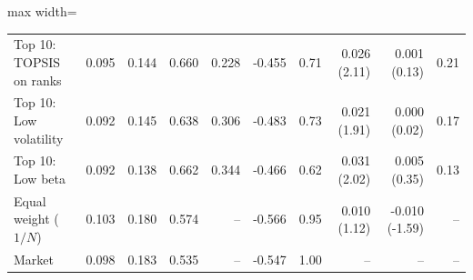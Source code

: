 \begin{table}[!htbp]
\begin{adjustbox}{max width=\textwidth}
\begin{tabular}{lrrrrrrrrr}
Top 10: TOPSIS on ranks & 0.095 & 0.144 & 0.660 & 0.228 & -0.455 & 0.71 & 0.026 (2.11) & 0.001 (0.13) & 0.21 \\
Top 10: Low volatility & 0.092 & 0.145 & 0.638 & 0.306 & -0.483 & 0.73 & 0.021 (1.91) & 0.000 (0.02) & 0.17 \\
Top 10: Low beta & 0.092 & 0.138 & 0.662 & 0.344 & -0.466 & 0.62 & 0.031 (2.02) & 0.005 (0.35) & 0.13 \\
Equal weight ($1/N$) & 0.103 & 0.180 & 0.574 & -- & -0.566 & 0.95 & 0.010 (1.12) & -0.010 (-1.59) & -- \\
Market & 0.098 & 0.183 & 0.535 & -- & -0.547 & 1.00 & -- & -- & -- \\
\bottomrule
\end{tabular}
\end{adjustbox}
\end{table}
